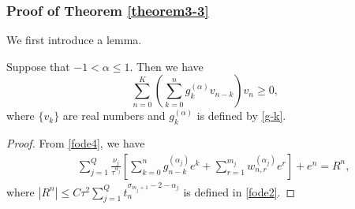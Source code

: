 \documentclass[10pt]{siamltex}
\begin{document}
\subsubsection{Proof of Theorem \ref{theorem3-3}}
We first introduce a lemma.
\begin{lemma}\label{lm4.1}
Suppose that $-1<\alpha \leq 1$. Then we have
$$\sum_{n=0}^K\left(\sum_{k=0}^ng^{(\alpha)}_{k}v_{n-k}\right)v_{n}
\geq 0,$$
where $\{v_k\}$ are real numbers and $g^{(\alpha)}_{k}$ is defined by \eqref{g-k}.
\end{lemma}
\begin{proof}
From \eqref{fode4}, we have
\begin{eqnarray}
&&\sum_{j=1}^Q\frac{\nu_j}{\tau^{\alpha_j}}\left[\sum_{k=0}^ng^{(\alpha_j)}_{n-k}e^k
+\sum_{r=1}^{m_j}w^{(\alpha_j)}_{n,r}e^r\right] + e^n=R^n,\label{apx-fode4}
\end{eqnarray}
where $|R^n|\leq C\tau^2\sum_{j=1}^Qt_{n}^{\sigma_{m_j+1}-2-\alpha_j}$ is defined in \eqref{fode2}.


\end{proof}
\end{document}
